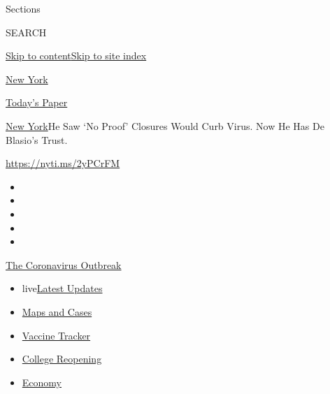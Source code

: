 Sections

SEARCH

\protect\hyperlink{site-content}{Skip to
content}\protect\hyperlink{site-index}{Skip to site index}

\href{https://www.nytimes.com/section/nyregion}{New York}

\href{https://myaccount.nytimes.com/auth/login?response_type=cookie\&client_id=vi}{}

\href{https://www.nytimes.com/section/todayspaper}{Today's Paper}

\href{/section/nyregion}{New York}\textbar{}He Saw `No Proof' Closures
Would Curb Virus. Now He Has De Blasio's Trust.

\url{https://nyti.ms/2yPCrFM}

\begin{itemize}
\item
\item
\item
\item
\item
\end{itemize}

\href{https://www.nytimes.com/news-event/coronavirus?action=click\&pgtype=Article\&state=default\&region=TOP_BANNER\&context=storylines_menu}{The
Coronavirus Outbreak}

\begin{itemize}
\tightlist
\item
  live\href{https://www.nytimes.com/2020/08/04/world/coronavirus-cases.html?action=click\&pgtype=Article\&state=default\&region=TOP_BANNER\&context=storylines_menu}{Latest
  Updates}
\item
  \href{https://www.nytimes.com/interactive/2020/us/coronavirus-us-cases.html?action=click\&pgtype=Article\&state=default\&region=TOP_BANNER\&context=storylines_menu}{Maps
  and Cases}
\item
  \href{https://www.nytimes.com/interactive/2020/science/coronavirus-vaccine-tracker.html?action=click\&pgtype=Article\&state=default\&region=TOP_BANNER\&context=storylines_menu}{Vaccine
  Tracker}
\item
  \href{https://www.nytimes.com/2020/08/02/us/covid-college-reopening.html?action=click\&pgtype=Article\&state=default\&region=TOP_BANNER\&context=storylines_menu}{College
  Reopening}
\item
  \href{https://www.nytimes.com/live/2020/08/04/business/stock-market-today-coronavirus?action=click\&pgtype=Article\&state=default\&region=TOP_BANNER\&context=storylines_menu}{Economy}
\end{itemize}

